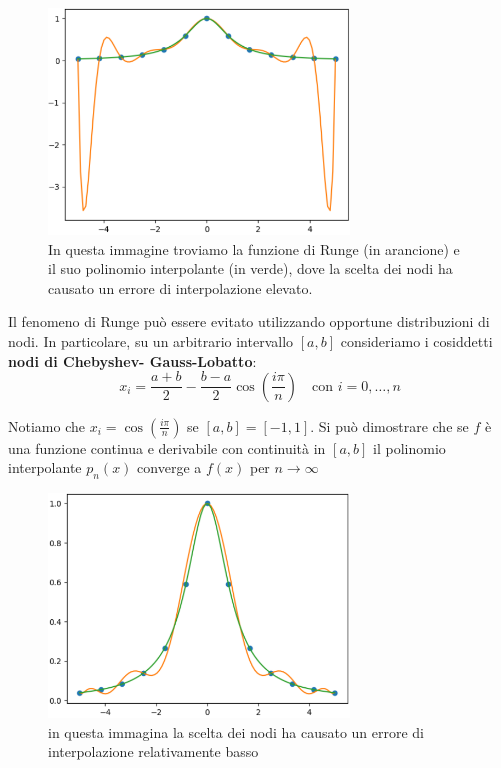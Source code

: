 \begin{figure}[h!]
    \centering
    \includegraphics[width=8cm]{img/runge_interpolato_male.png}
    \caption{In questa immagine troviamo la funzione di Runge (in arancione) e il suo polinomio interpolante (in verde), dove la scelta dei nodi ha causato un errore di interpolazione elevato.}
    \label{fig:runge_interpolazione}
\end{figure}

Il fenomeno di Runge può essere evitato utilizzando opportune distribuzioni di nodi. In
particolare, su un arbitrario intervallo $[a, b]$ consideriamo i cosiddetti \textbf{nodi di Chebyshev-
Gauss-Lobatto}:
\[
    x_i = \frac{a+b}{2} - \frac{b-a}{2} \cos{(\frac{i\pi}{n})} \quad \text{con }i= 0 ,\dots, n   
\]

Notiamo che $x_i = \cos{(\frac{i\pi}{n})}$ se $[a,b] = [-1,1]$. Si può dimostrare che se $f$ è una funzione continua e derivabile con continuità in $[a,b]$ il polinomio interpolante $p_n(x)$ converge a $f(x)$ per $n\to\infty$

\begin{figure}[h!]
    \centering
    \includegraphics[width=8cm]{img/runge_interpolato_bene.png}
    \caption{in questa immagina la scelta dei nodi ha causato un errore di interpolazione relativamente basso}
    \label{fig:runge_interpolazione_bella}
\end{figure}

